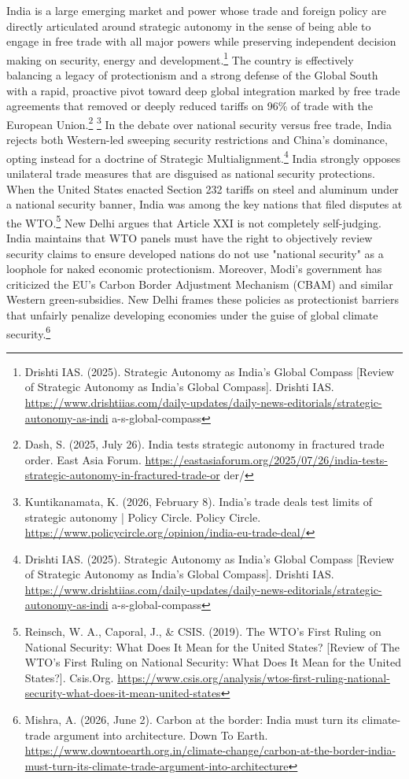 India is a large emerging market and power whose trade and foreign policy are directly articulated around strategic autonomy in the sense of being able to engage in free trade with all major powers while preserving independent decision making on security, energy and development.\footnote{Drishti IAS. (2025). Strategic Autonomy as India’s Global Compass [Review of Strategic Autonomy as India’s Global Compass]. Drishti IAS. \url{https://www.drishtiias.com/daily-updates/daily-news-editorials/strategic-autonomy-as-indi} a-s-global-compass} The country is effectively balancing a legacy of protectionism and a strong defense of the Global South with a rapid, proactive pivot toward deep global integration marked by free trade agreements that removed or deeply reduced tariffs on 96\% of trade with the European Union.\footnote{Dash, S. (2025, July 26). India tests strategic autonomy in fractured trade order. East Asia Forum. \url{https://eastasiaforum.org/2025/07/26/india-tests-strategic-autonomy-in-fractured-trade-or} der/} \footnote{Kuntikanamata, K. (2026, February 8). India’s trade deals test limits of strategic autonomy | Policy Circle. Policy Circle. \url{https://www.policycircle.org/opinion/india-eu-trade-deal/}} In the debate over national security versus free trade, India rejects both Western-led sweeping security restrictions and China's dominance, opting instead for a doctrine of Strategic Multialignment.\footnote{Drishti IAS. (2025). Strategic Autonomy as India’s Global Compass [Review of Strategic Autonomy as India’s Global Compass]. Drishti IAS. \url{https://www.drishtiias.com/daily-updates/daily-news-editorials/strategic-autonomy-as-indi} a-s-global-compass} India strongly opposes unilateral trade measures that are disguised as national security protections. When the United States enacted Section 232 tariffs on steel and aluminum under a national security banner, India was among the key nations that filed disputes at the WTO.\footnote{Reinsch, W. A., Caporal, J., \& CSIS. (2019). The WTO’s First Ruling on National Security: What Does It Mean for the United States? [Review of The WTO’s First Ruling on National Security: What Does It Mean for the United States?]. Csis.Org. \url{https://www.csis.org/analysis/wtos-first-ruling-national-security-what-does-it-mean-united-states}} New Delhi argues that Article XXI is not completely self-judging. India maintains that WTO panels must have the right to objectively review security claims to ensure developed nations do not use "national security" as a loophole for naked economic protectionism. Moreover, Modi’s government has criticized the EU’s Carbon Border Adjustment Mechanism (CBAM) and similar Western green-subsidies. New Delhi frames these policies as protectionist barriers that unfairly penalize developing economies under the guise of global climate security.\footnote{Mishra, A. (2026, June 2). Carbon at the border: India must turn its climate-trade argument into architecture. Down To Earth. \url{https://www.downtoearth.org.in/climate-change/carbon-at-the-border-india-must-turn-its-climate-trade-argument-into-architecture}}

